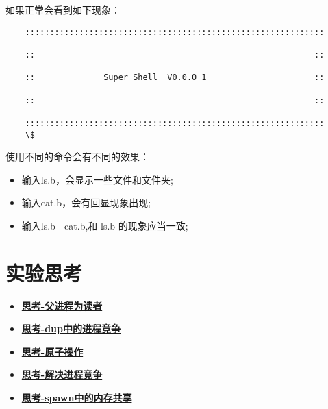 如果正常会看到如下现象：

\begin{verbatim}
	:::::::::::::::::::::::::::::::::::::::::::::::::::::::::::::
	
	::                                                         ::
	
	::              Super Shell  V0.0.0_1                      ::
	
	::                                                         ::
	
	:::::::::::::::::::::::::::::::::::::::::::::::::::::::::::::
	\$
\end{verbatim}

使用不同的命令会有不同的效果：
\begin{itemize}
	\item 输入ls.b，会显示一些文件和文件夹;
	\item 输入cat.b，会有回显现象出现;
	\item 输入ls.b | cat.b,和 ls.b 的现象应当一致;
\end{itemize}

\section{实验思考}

\begin{itemize}
	\item \hyperref[think-father-reader]{\textbf{\textcolor{baseB}{思考-父进程为读者}}}
	\item \hyperref[think-dup]{\textbf{\textcolor{baseB}{思考-dup中的进程竞争}}}
	\item \hyperref[think-automatic]{\textbf{\textcolor{baseB}{思考-原子操作}}}
	\item \hyperref[think-race]{\textbf{\textcolor{baseB}{思考-解决进程竞争}}}
	\item \hyperref[think-spawn]{\textbf{\textcolor{baseB}{思考-spawn中的内存共享}}}
\end{itemize}





